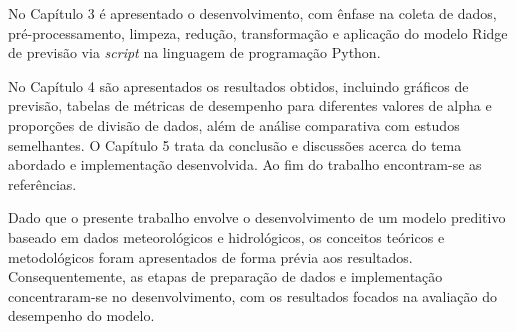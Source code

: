 No Capítulo 3 é apresentado o desenvolvimento, com ênfase na coleta de dados, pré-processamento, limpeza, redução, transformação e aplicação do modelo Ridge de previsão via \textit{script} na linguagem de programação Python.

No Capítulo 4 são apresentados os resultados obtidos, incluindo gráficos de previsão, tabelas de métricas de desempenho para diferentes valores de alpha e proporções de divisão de dados, além de análise comparativa com estudos semelhantes. O Capítulo 5 trata da conclusão e discussões acerca do tema abordado e implementação desenvolvida. Ao fim do trabalho encontram-se as referências.

Dado que o presente trabalho envolve o desenvolvimento de um modelo preditivo baseado em dados meteorológicos e hidrológicos, os conceitos teóricos e metodológicos foram apresentados de forma prévia aos resultados. Consequentemente, as etapas de preparação de dados e implementação concentraram-se no desenvolvimento, com os resultados focados na avaliação do desempenho do modelo.